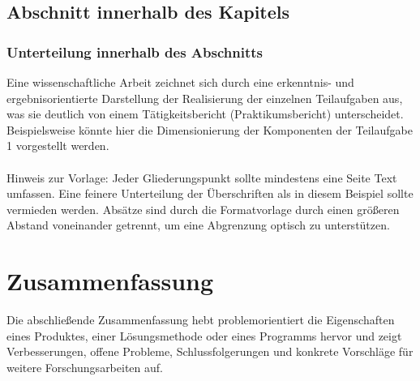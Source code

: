 \documentclass[%
  paper=a4,
  fontsize=12pt,
  twoside=false,
  headsepline=true,
  numbers=noenddot]{scrartcl}
\begin{document}
\subsection{Abschnitt innerhalb des Kapitels}
\subsubsection{Unterteilung innerhalb des Abschnitts}

Eine wissenschaftliche Arbeit zeichnet sich durch eine erkenntnis- und ergebnisorientierte Darstellung der Realisierung der einzelnen Teilaufgaben aus, was sie deutlich von einem Tätigkeitsbericht (Praktikumsbericht) unterscheidet. Beispielsweise könnte hier die Dimensionierung der Komponenten der Teilaufgabe 1 vorgestellt werden.\\\\
Hinweis zur Vorlage: Jeder Gliederungspunkt sollte mindestens eine Seite Text umfassen. Eine feinere Unterteilung der Überschriften als in diesem Beispiel sollte vermieden werden.
Absätze sind durch die Formatvorlage durch einen größeren Abstand voneinander getrennt, um eine Abgrenzung optisch zu unterstützen.




\section{Zusammenfassung}

Die abschließende Zusammenfassung hebt problemorientiert die Eigenschaften eines
Produktes, einer Lösungsmethode oder eines Programms hervor und zeigt Verbesserungen,
offene Probleme, Schlussfolgerungen und konkrete Vorschläge für weitere Forschungsarbeiten auf.

\end{document}
